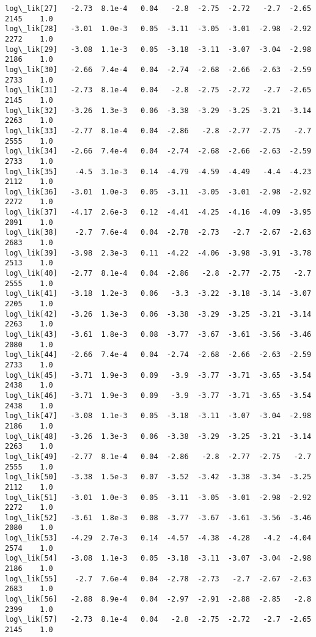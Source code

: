 \documentclass[11pt]{article}
\begin{document}
\begin{Verbatim}[commandchars=\\\{\}]
log\_lik[27]   -2.73  8.1e-4   0.04   -2.8  -2.75  -2.72   -2.7  -2.65   2145    1.0
log\_lik[28]   -3.01  1.0e-3   0.05  -3.11  -3.05  -3.01  -2.98  -2.92   2272    1.0
log\_lik[29]   -3.08  1.1e-3   0.05  -3.18  -3.11  -3.07  -3.04  -2.98   2186    1.0
log\_lik[30]   -2.66  7.4e-4   0.04  -2.74  -2.68  -2.66  -2.63  -2.59   2733    1.0
log\_lik[31]   -2.73  8.1e-4   0.04   -2.8  -2.75  -2.72   -2.7  -2.65   2145    1.0
log\_lik[32]   -3.26  1.3e-3   0.06  -3.38  -3.29  -3.25  -3.21  -3.14   2263    1.0
log\_lik[33]   -2.77  8.1e-4   0.04  -2.86   -2.8  -2.77  -2.75   -2.7   2555    1.0
log\_lik[34]   -2.66  7.4e-4   0.04  -2.74  -2.68  -2.66  -2.63  -2.59   2733    1.0
log\_lik[35]    -4.5  3.1e-3   0.14  -4.79  -4.59  -4.49   -4.4  -4.23   2112    1.0
log\_lik[36]   -3.01  1.0e-3   0.05  -3.11  -3.05  -3.01  -2.98  -2.92   2272    1.0
log\_lik[37]   -4.17  2.6e-3   0.12  -4.41  -4.25  -4.16  -4.09  -3.95   2091    1.0
log\_lik[38]    -2.7  7.6e-4   0.04  -2.78  -2.73   -2.7  -2.67  -2.63   2683    1.0
log\_lik[39]   -3.98  2.3e-3   0.11  -4.22  -4.06  -3.98  -3.91  -3.78   2513    1.0
log\_lik[40]   -2.77  8.1e-4   0.04  -2.86   -2.8  -2.77  -2.75   -2.7   2555    1.0
log\_lik[41]   -3.18  1.2e-3   0.06   -3.3  -3.22  -3.18  -3.14  -3.07   2205    1.0
log\_lik[42]   -3.26  1.3e-3   0.06  -3.38  -3.29  -3.25  -3.21  -3.14   2263    1.0
log\_lik[43]   -3.61  1.8e-3   0.08  -3.77  -3.67  -3.61  -3.56  -3.46   2080    1.0
log\_lik[44]   -2.66  7.4e-4   0.04  -2.74  -2.68  -2.66  -2.63  -2.59   2733    1.0
log\_lik[45]   -3.71  1.9e-3   0.09   -3.9  -3.77  -3.71  -3.65  -3.54   2438    1.0
log\_lik[46]   -3.71  1.9e-3   0.09   -3.9  -3.77  -3.71  -3.65  -3.54   2438    1.0
log\_lik[47]   -3.08  1.1e-3   0.05  -3.18  -3.11  -3.07  -3.04  -2.98   2186    1.0
log\_lik[48]   -3.26  1.3e-3   0.06  -3.38  -3.29  -3.25  -3.21  -3.14   2263    1.0
log\_lik[49]   -2.77  8.1e-4   0.04  -2.86   -2.8  -2.77  -2.75   -2.7   2555    1.0
log\_lik[50]   -3.38  1.5e-3   0.07  -3.52  -3.42  -3.38  -3.34  -3.25   2112    1.0
log\_lik[51]   -3.01  1.0e-3   0.05  -3.11  -3.05  -3.01  -2.98  -2.92   2272    1.0
log\_lik[52]   -3.61  1.8e-3   0.08  -3.77  -3.67  -3.61  -3.56  -3.46   2080    1.0
log\_lik[53]   -4.29  2.7e-3   0.14  -4.57  -4.38  -4.28   -4.2  -4.04   2574    1.0
log\_lik[54]   -3.08  1.1e-3   0.05  -3.18  -3.11  -3.07  -3.04  -2.98   2186    1.0
log\_lik[55]    -2.7  7.6e-4   0.04  -2.78  -2.73   -2.7  -2.67  -2.63   2683    1.0
log\_lik[56]   -2.88  8.9e-4   0.04  -2.97  -2.91  -2.88  -2.85   -2.8   2399    1.0
log\_lik[57]   -2.73  8.1e-4   0.04   -2.8  -2.75  -2.72   -2.7  -2.65   2145    1.0

\end{Verbatim}
\end{document}
